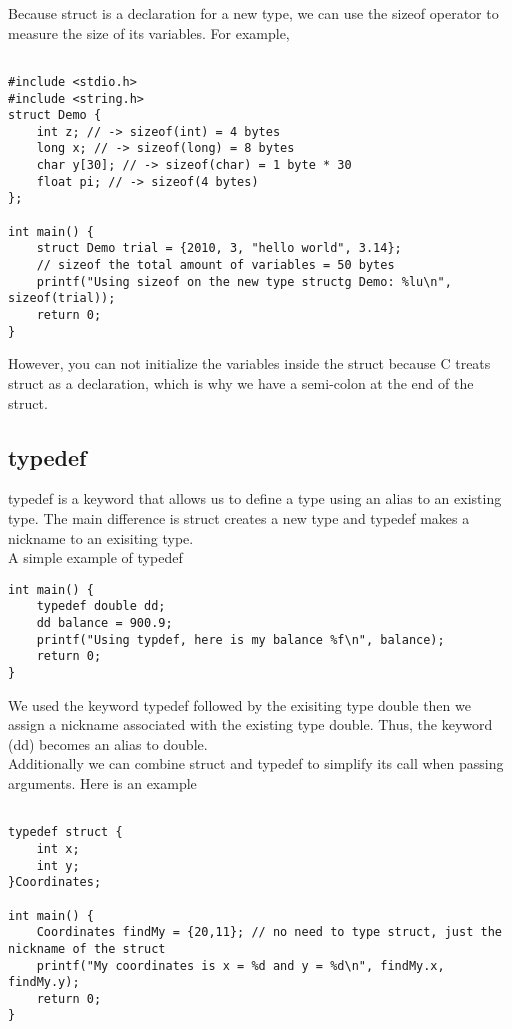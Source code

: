 \documentclass{article}
\begin{document}
\noindent Because struct is a declaration for a new type, we can use the sizeof operator to measure the size of its variables. For example, 

\begin{verbatim}

#include <stdio.h>
#include <string.h>
struct Demo {
	int z; // -> sizeof(int) = 4 bytes
	long x; // -> sizeof(long) = 8 bytes
	char y[30]; // -> sizeof(char) = 1 byte * 30
	float pi; // -> sizeof(4 bytes)
};

int main() {
	struct Demo trial = {2010, 3, "hello world", 3.14};
	// sizeof the total amount of variables = 50 bytes
	printf("Using sizeof on the new type structg Demo: %lu\n", sizeof(trial));
	return 0;
}

\end{verbatim}

However, you can not initialize the variables inside the struct because C treats struct as a declaration, which is why we have a semi-colon at the end
of the struct.

\subsection*{typedef}
typedef is a keyword that allows us to define a type using an alias to an existing type. The main difference is struct creates a new type and typedef
makes a nickname to an exisiting type. \\

\noindent A simple example of typedef

\begin{verbatim}
int main() {
	typedef double dd;
	dd balance = 900.9;
	printf("Using typdef, here is my balance %f\n", balance);
	return 0;
}
\end{verbatim}

We used the keyword typedef followed by the exisiting type double then we assign a nickname associated 
with the existing type double. Thus, the keyword (dd) becomes an alias to double. \\

\noindent Additionally we can combine struct and typedef to simplify its call when passing arguments. 
Here is an example

\begin{verbatim}

typedef struct {
	int x;
	int y;
}Coordinates;

int main() {
	Coordinates findMy = {20,11}; // no need to type struct, just the nickname of the struct
	printf("My coordinates is x = %d and y = %d\n", findMy.x, findMy.y);
	return 0;
}
\end{verbatim}
\end{document}
